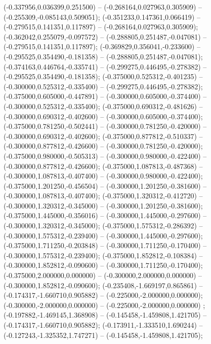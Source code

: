  (-0.337956,0.036399,0.251500) -- (-0.268164,0.027963,0.305909) -- (-0.255309,-0.085143,0.509051);
 (-0.351233,0.147361,0.066419) -- (-0.279515,0.141351,0.117897) -- (-0.268164,0.027963,0.305909);
 (-0.362042,0.255079,-0.097572) -- (-0.288805,0.251487,-0.047081) -- (-0.279515,0.141351,0.117897);
 (-0.369829,0.356041,-0.233600) -- (-0.295525,0.354490,-0.181358) -- (-0.288805,0.251487,-0.047081);
 (-0.374163,0.446764,-0.335741) -- (-0.299275,0.446495,-0.278382) -- (-0.295525,0.354490,-0.181358);
 (-0.375000,0.525312,-0.401235) -- (-0.300000,0.525312,-0.335400) -- (-0.299275,0.446495,-0.278382);
 (-0.375000,0.605000,-0.447891) -- (-0.300000,0.605000,-0.374400) -- (-0.300000,0.525312,-0.335400);
 (-0.375000,0.690312,-0.481626) -- (-0.300000,0.690312,-0.402600) -- (-0.300000,0.605000,-0.374400);
 (-0.375000,0.781250,-0.502441) -- (-0.300000,0.781250,-0.420000) -- (-0.300000,0.690312,-0.402600);
 (-0.375000,0.877812,-0.510337) -- (-0.300000,0.877812,-0.426600) -- (-0.300000,0.781250,-0.420000);
 (-0.375000,0.980000,-0.505313) -- (-0.300000,0.980000,-0.422400) -- (-0.300000,0.877812,-0.426600);
 (-0.375000,1.087813,-0.487368) -- (-0.300000,1.087813,-0.407400) -- (-0.300000,0.980000,-0.422400);
 (-0.375000,1.201250,-0.456504) -- (-0.300000,1.201250,-0.381600) -- (-0.300000,1.087813,-0.407400);
 (-0.375000,1.320312,-0.412720) -- (-0.300000,1.320312,-0.345000) -- (-0.300000,1.201250,-0.381600);
 (-0.375000,1.445000,-0.356016) -- (-0.300000,1.445000,-0.297600) -- (-0.300000,1.320312,-0.345000);
 (-0.375000,1.575312,-0.286392) -- (-0.300000,1.575312,-0.239400) -- (-0.300000,1.445000,-0.297600);
 (-0.375000,1.711250,-0.203848) -- (-0.300000,1.711250,-0.170400) -- (-0.300000,1.575312,-0.239400);
 (-0.375000,1.852812,-0.108384) -- (-0.300000,1.852812,-0.090600) -- (-0.300000,1.711250,-0.170400);
 (-0.375000,2.000000,0.000000) -- (-0.300000,2.000000,0.000000) -- (-0.300000,1.852812,-0.090600);
 (-0.235408,-1.669197,0.865861) -- (-0.174317,-1.660710,0.905882) -- (-0.225000,-2.000000,0.000000);
 (-0.300000,-2.000000,0.000000) -- (-0.225000,-2.000000,0.000000) ;
 (-0.197882,-1.469145,1.368908) -- (-0.145458,-1.459808,1.421705) -- (-0.174317,-1.660710,0.905882);
 (-0.173911,-1.333510,1.690244) -- (-0.127243,-1.325352,1.747271) -- (-0.145458,-1.459808,1.421705);
